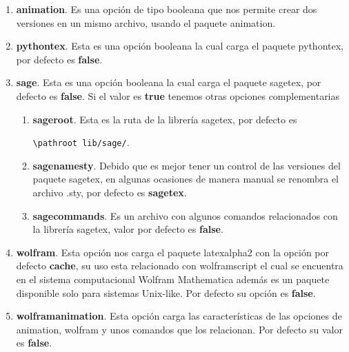 {\begin{enumerate}
\begin{docCommand}{hostFiles}{}
		\end{docCommand}
		\item \textbf{animation}. Es una opción de tipo booleana que nos permite crear dos versiones en un mismo archivo, usando el paquete animation.
		\item \textbf{pythontex}. Esta es una opción booleana la cual carga el paquete pythontex, por defecto es \textbf{false}.
		\item \textbf{sage}. Esta es una opción booleana la cual carga el paquete sagetex, por defecto es \textbf{false}. Si el valor es \textbf{true} tenemos otras opciones complementarias
		\begin{enumerate}
			\item \textbf{sageroot}.
			Esta es la ruta de la librería sagetex, por defecto es 
			\begin{center}
				\verb|\pathroot lib/sage/|.
			\end{center}
			\item \textbf{sagenamesty}. Debido que es mejor tener un control de las versiones del paquete sagetex, en algunas ocasiones de manera manual se renombra el archivo .sty, por defecto es \textbf{sagetex}.
			\item \textbf{sagecommands}. Es un archivo con algunos comandos relacionados con la librería sagetex, valor por defecto es \textbf{false}.
		\end{enumerate}
		\item \textbf{wolfram}. Esta opción nos carga el paquete latexalpha2 con la opción por defecto \textbf{cache}, su uso esta relacionado con wolframscript el cual se encuentra en el sistema computacional Wolfram Mathematica además es un paquete disponible solo para sistemas Unix-like. Por defecto su opción es \textbf{false}.
		\item \textbf{wolframanimation}. Esta opción carga las características de las opciones de animation, wolfram y unos comandos que los relacionan. Por defecto su valor es \textbf{false}.
	\end{enumerate}
}
